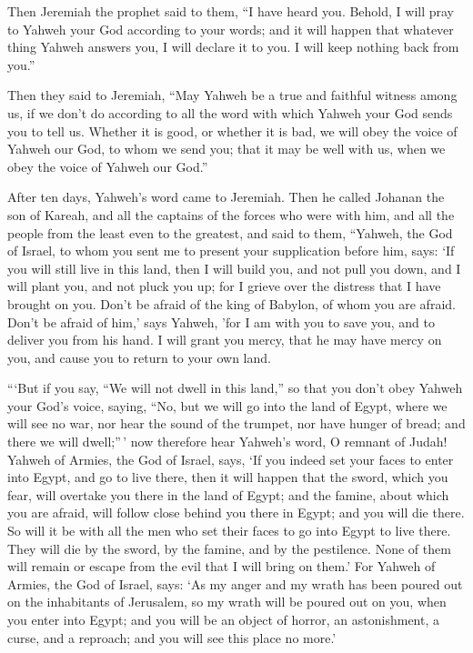 Then Jeremiah the prophet said to them, ``I have heard
you. Behold, I will pray to Yahweh your God according to your words; and
it will happen that whatever thing Yahweh answers you, I will declare it
to you. I will keep nothing back from you.''

 Then they said to Jeremiah, ``May Yahweh be a true and
faithful witness among us, if we don't do according to all the word with
which Yahweh your God sends you to tell us.  Whether it is
good, or whether it is bad, we will obey the voice of Yahweh our God, to
whom we send you; that it may be well with us, when we obey the voice of
Yahweh our God.''

 After ten days, Yahweh's word came to Jeremiah.
 Then he called Johanan the son of Kareah, and all the
captains of the forces who were with him, and all the people from the
least even to the greatest,  and said to them, ``Yahweh,
the God of Israel, to whom you sent me to present your supplication
before him, says:  `If you will still live in this land,
then I will build you, and not pull you down, and I will plant you, and
not pluck you up; for I grieve over the distress that I have brought on
you.  Don't be afraid of the king of Babylon, of whom you
are afraid. Don't be afraid of him,' says Yahweh, 'for I am with you to
save you, and to deliver you from his hand.  I will grant
you mercy, that he may have mercy on you, and cause you to return to
your own land.

 ```But if you say, ``We will not dwell in this land,''
so that you don't obey Yahweh your God's voice,  saying,
``No, but we will go into the land of Egypt, where we will see no war,
nor hear the sound of the trumpet, nor have hunger of bread; and there
we will dwell;''\,'  now therefore hear Yahweh's word, O
remnant of Judah! Yahweh of Armies, the God of Israel, says, `If you
indeed set your faces to enter into Egypt, and go to live there,
 then it will happen that the sword, which you fear, will
overtake you there in the land of Egypt; and the famine, about which you
are afraid, will follow close behind you there in Egypt; and you will
die there.  So will it be with all the men who set their
faces to go into Egypt to live there. They will die by the sword, by the
famine, and by the pestilence. None of them will remain or escape from
the evil that I will bring on them.'  For Yahweh of
Armies, the God of Israel, says: `As my anger and my wrath has been
poured out on the inhabitants of Jerusalem, so my wrath will be poured
out on you, when you enter into Egypt; and you will be an object of
horror, an astonishment, a curse, and a reproach; and you will see this
place no more.'

